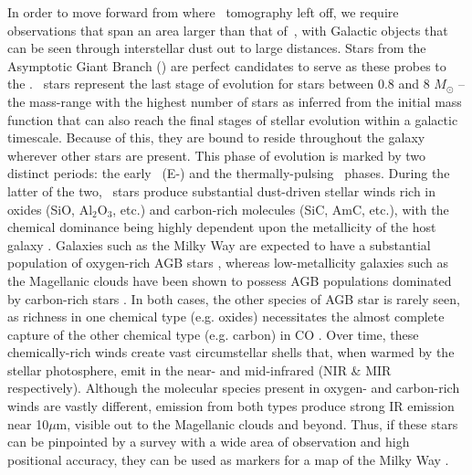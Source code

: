 In order to move forward from where \sdss\, tomography left off, we require observations that span an area larger than that of \sdss\,, with Galactic objects that can be seen through interstellar dust out to large distances. Stars from the Asymptotic Giant Branch (\agb) are perfect candidates to serve as these probes to the \mw. \agb\, stars represent the last stage of evolution for stars between 0.8 and 8 $M_\odot$ \citep{1983ARA&A..21..271I, 2005ARA&A..43..435H} -- the mass-range with the highest number of stars as inferred from the  \cite{2001MNRAS.322..231K} initial mass function that can also reach the final stages of stellar evolution within a galactic timescale. Because of this, they are bound to reside throughout the galaxy wherever other stars are present. This phase of evolution is marked by two distinct periods: the early \agb\, (E-\agb)  and the thermally-pulsing \agb\, phases. During the latter of the two, \agb\, stars produce substantial dust-driven stellar winds \citep[$10^{-7} < \dot{M} < 10^{-4}$ $M_\odot$ yr$^{-1}$,][]{2002A&A...391.1053O} rich in oxides (SiO, Al$_2$O$_3$, etc.) and carbon-rich molecules (SiC, AmC, etc.), with the chemical dominance being highly dependent upon the metallicity of the host galaxy \citep{2005A&A...434..691M}. Galaxies such as the Milky Way are expected to have a substantial population of oxygen-rich AGB stars \citep{1985A&A...152L...1H}, whereas low-metallicity galaxies such as the Magellanic clouds have been shown to possess AGB populations dominated by carbon-rich stars \citep{2011AJ....142..103B}. In both cases, the other species of AGB star is rarely seen, as richness in one chemical type (e.g. oxides)  necessitates the almost complete capture of the other chemical type (e.g. carbon) in CO \citep{1983ARA&A..21..271I}. Over time, these chemically-rich winds create vast circumstellar shells that, when warmed by the stellar photosphere, emit in the near- and mid-infrared (NIR \& MIR respectively). Although the molecular species present in oxygen- and carbon-rich winds are vastly different, emission from both types produce strong IR emission near 10$\mu$m, visible out to the Magellanic clouds \citep{2011A&A...534A..79I} and beyond. Thus, if these stars can be pinpointed by a survey with a wide area of observation and high positional accuracy, they can be used as markers for a map of the Milky Way \citep{2013RAA....13..323T}.

